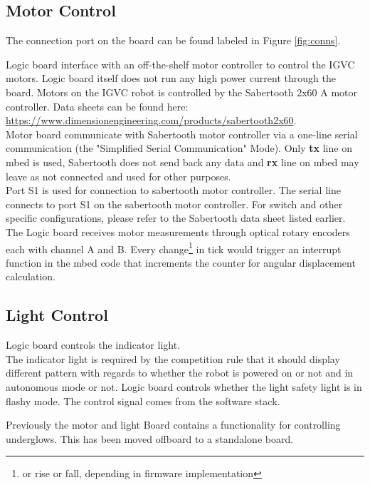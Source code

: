 \documentclass[letterpaper, 12pt]{article}
\begin{document}
\subsection{Motor Control}

The connection port on the board can be found labeled in Figure \ref{fig:conns}.

Logic board interface with an off-the-shelf motor controller to control the IGVC motors. Logic board itself
does not run any high power current through the board. Motors on the IGVC robot is controlled by the
Sabertooth 2x60 A motor controller. Data sheets can be found here:
\url{https://www.dimensionengineering.com/products/sabertooth2x60}.\\

Motor board communicate with Sabertooth motor controller via a one-line serial communication
(the "Simplified Serial Communication" Mode). Only \textbf{tx} line on mbed is used, Sabertooth
does not send back any data and \textbf{rx} line on mbed may leave as not connected and used
for other purposes.\\

Port S1 is used for connection to sabertooth motor controller. The serial line connects to port
S1 on the sabertooth motor controller. For switch and other specific configurations, please refer
to the Sabertooth data sheet listed earlier. \\

The Logic board receives motor measurements through optical rotary encoders each with channel A and B.
Every change\footnote{or rise or fall, depending in firmware implementation} in tick would trigger an interrupt
function in the mbed code that increments the counter for angular displacement calculation. 

\subsection{Light Control}
Logic board controls the indicator light.\\

The indicator light is required by the competition rule that it should display different pattern
with regards to whether the robot is powered on or not and in autonomous mode or not. 
Logic board controls whether the light safety light is in flashy mode. The control signal comes from
the software stack.

Previously the motor and light Board contains a functionality for controlling underglows. This has been
moved offboard to a standalone board.
\end{document}
